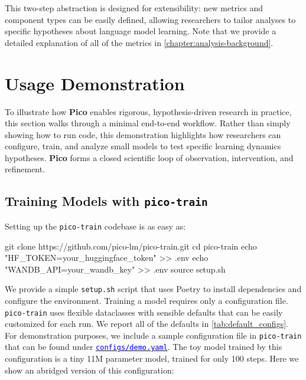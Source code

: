 This two-step abstraction is designed for extensibility: new metrics and component types can be easily defined, allowing researchers to tailor analyses to specific hypotheses about language model learning. Note that we provide a detailed explanation of all of the metrics in \cref{chapter:analysis-background}.

\section{Usage Demonstration} 
\label{sec:usage-demonstration}

To illustrate how \textbf{Pico} enables rigorous, hypothesis-driven research in practice, this section walks through a minimal end-to-end workflow. Rather than simply showing how to run code, this demonstration highlights how researchers can configure, train, and analyze small models to test specific learning dynamics hypotheses. \textbf{Pico} forms a closed scientific loop of observation, intervention, and refinement.

\subsection{Training Models with \texttt{pico-train}}

Setting up the \texttt{pico-train} codebase is as easy as:

\begin{center}
    \begin{codelisting}
        git clone https://github.com/pico-lm/pico-train.git
        cd pico-train
        echo "HF_TOKEN=your_huggingface_token" >> .env
        echo "WANDB_API=your_wandb_key" >> .env
        source setup.sh
    \end{codelisting}
\end{center}

We provide a simple \verb|setup.sh| script that uses Poetry \citep{poetry} to install dependencies and configure the environment. Training a model requires only a configuration file. \texttt{pico-train} uses flexible dataclasses with sensible defaults that can be easily customized for each run. We report all of the defaults in \cref{tab:default_configs}. For demonstration purposes, we include a sample configuration file in \texttt{pico-train} that can be found under \href{https://github.com/pico-lm/pico-train/blob/main/configs/demo.yaml}{\textcolor{blue}{\texttt{configs/demo.yaml}}}. The toy model trained by this configuration is a tiny 11M parameter model, trained for only 100 steps. Here we show an abridged version of this configuration:



